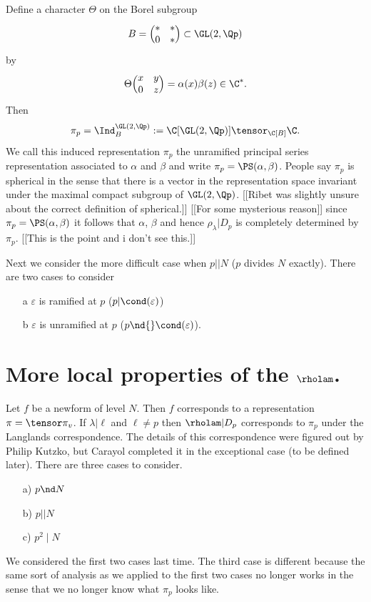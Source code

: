 \documentclass{report}
\begin{document}
Define a character $\Theta$ on the Borel subgroup
$$B=\Bigl(\begin{matrix}*&*\\0&*\end{matrix}\Bigr)\subset\GL(2,\Qp)$$
by
$$\Theta\Bigl(\begin{matrix}x&y\\0&z\end{matrix}\Bigr)=\alpha(x)\beta(z)\in\C^*.$$
Then
$$\pi_p=\Ind_B^{\GL(2,\Qp)}:=\C[\GL(2,\Qp)]\tensor_{\C[B]}\C.$$
We call this induced representation $\pi_p$ the
unramified principal series representation associated
to $\alpha$ and $\beta$ and write $\pi_p=\PS(\alpha,\beta)$.
People say $\pi_p$ is spherical in the sense that there is a vector
in the representation space invariant under the maximal compact
subgroup of $\GL(2,\Qp)$. [[Ribet was slightly unsure about the correct
definition of spherical.]]
[[For some mysterious reason]] since $\pi_p=\PS(\alpha,\beta)$ it follows that
$\alpha$, $\beta$ and hence $\rho_{\lambda}|D_p$ is completely determined
by $\pi_p$. [[This is the point and i don't see this.]]

Next we consider the more difficult case when $p||N$ ($p$ divides
$N$ exactly). There are two cases to consider
\begin{itemize}
\item[a] $\varepsilon$ is ramified at $p$ ($p|\cond(\varepsilon)$)
\item[b] $\varepsilon$ is unramified at $p$ ($p\nd{}\cond(\varepsilon)$).
\end{itemize}



\section{More local properties of the $\rholam$.}

Let $f$ be a newform of level $N$. Then $f$ corresponds to a representation
$\pi=\tensor\pi_v$. If $\lambda|\ell$ and $\ell\neq p$ then
$\rholam|D_p$ corresponds to $\pi_p$ under the Langlands
correspondence. The details of this correspondence were figured out
by Philip Kutzko, but Carayol completed it in the exceptional
case (to be defined later).
There are three cases to consider.
\begin{itemize}
\item[a)] $p\nd N$
\item[b)] $p||N$
\item[c)] $p^2\mid N$
\end{itemize}
We considered the first two cases last time. The third case is
different because the same sort of analysis as we applied to the
first two cases no longer works in the sense that we no longer know what
$\pi_p$ looks like.
\end{document}
